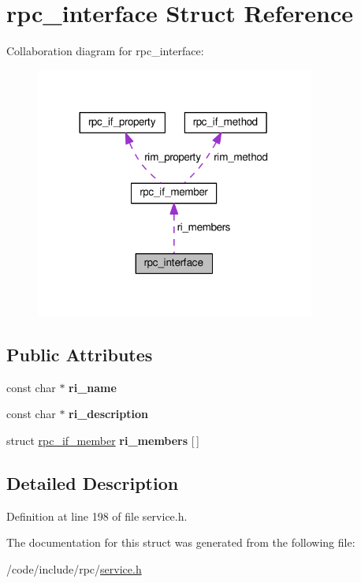 \hypertarget{structrpc__interface}{}\section{rpc\+\_\+interface Struct Reference}
\label{structrpc__interface}


Collaboration diagram for rpc\+\_\+interface\+:
\nopagebreak
\begin{figure}[H]
\begin{center}
\leavevmode
\includegraphics[width=260pt]{structrpc__interface__coll__graph}
\end{center}
\end{figure}
\subsection*{Public Attributes}
\begin{DoxyCompactItemize}
\item 
const char $\ast$ {\bfseries ri\+\_\+name}\hypertarget{structrpc__interface_a7e1b33ccc8a32e6daaf69ec6daec7bc1}{}\label{structrpc__interface_a7e1b33ccc8a32e6daaf69ec6daec7bc1}

\item 
const char $\ast$ {\bfseries ri\+\_\+description}\hypertarget{structrpc__interface_a851f0bfb495af801a2958fef34596e6a}{}\label{structrpc__interface_a851f0bfb495af801a2958fef34596e6a}

\item 
struct \hyperlink{structrpc__if__member}{rpc\+\_\+if\+\_\+member} {\bfseries ri\+\_\+members} \mbox{[}$\,$\mbox{]}\hypertarget{structrpc__interface_af28bb2a8e330bb25c2c7e681cd2f7356}{}\label{structrpc__interface_af28bb2a8e330bb25c2c7e681cd2f7356}

\end{DoxyCompactItemize}


\subsection{Detailed Description}


Definition at line 198 of file service.\+h.



The documentation for this struct was generated from the following file\+:\begin{DoxyCompactItemize}
\item 
/code/include/rpc/\hyperlink{service_8h}{service.\+h}\end{DoxyCompactItemize}

